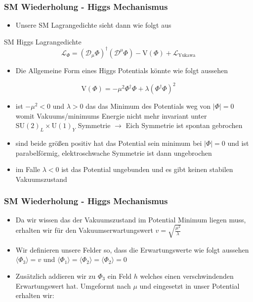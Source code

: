 \documentclass{beamer}
\begin{document}
\begin{frame}
\frametitle{SM Wiederholung - Higgs Mechanismus }
\begin{itemize}
\item Unsere SM Lagrangedichte sieht dann wie folgt aus
\end{itemize}
\begin{block}{SM Higgs Lagrangedichte}
\begin{equation}
\mathscr{L}_{\Phi}=(\mathscr{D}_{\mu}\Phi)^{\dagger}(\mathscr{D}^{\mu}\Phi) - \text{V}(\Phi) + \mathscr{L}_{\text{Yukawa}}
\end{equation}
\end{block}
\begin{itemize}
\item Die Allgemeine Form eines Higgs Potentials könnte wie folgt aussehen 
\end{itemize}
\begin{equation}
 \text{V}(\Phi)=-\mu^{2} \Phi^{\dagger}\Phi +\lambda ( \Phi^{\dagger}\Phi)^{2}
\end{equation}
\end{frame}
\begin{frame}
\begin{itemize}
\item ist $-\mu^{2}<0$ und $\lambda>0$  das das Minimum des Potentials weg von $|\Phi|=0$ womit Vakuums/minimums Energie nicht mehr invariant unter $\text{SU}(2)_{L}\times\text{U}(1)_{Y}$ Symmetrie $\rightarrow$ Eich Symmetrie ist spontan gebrochen
\item sind beide größen positiv hat das Potential sein minimum bei  $|\Phi|=0$  und ist parabelförmig, elektroschwache Symmetrie ist dann ungebrochen
\item im Falle $\lambda<0$ ist das Potential ungebunden und es gibt keinen stabilen Vakuumszustand
\end{itemize}
\end{frame}

\begin{frame}
\frametitle{SM Wiederholung - Higgs Mechanismus }
\begin{itemize}
\item Da wir wissen das der Vakuumszustand im Potential Minimum liegen muss, erhalten wir für den Vakuumserwartungswert $v=\sqrt{\frac{\mu^2}{\lambda}}$
 \item Wir definieren unsere Felder so, dass die Erwartungswerte wie folgt aussehen $\langle \Phi_{3}\rangle=v$ und  $\langle \Phi_{1}\rangle=\langle \Phi_{2}\rangle=\langle \Phi_{2}\rangle=0$ 
 \item Zusätzlich addieren wir zu $\Phi_{3}$ ein Feld $h$ welches einen verschwindenden Erwartungswert hat. Umgeformt nach $\mu$ und eingesetzt in unser Potential erhalten wir:
 \end{itemize}
\end{frame}
\end{document}

